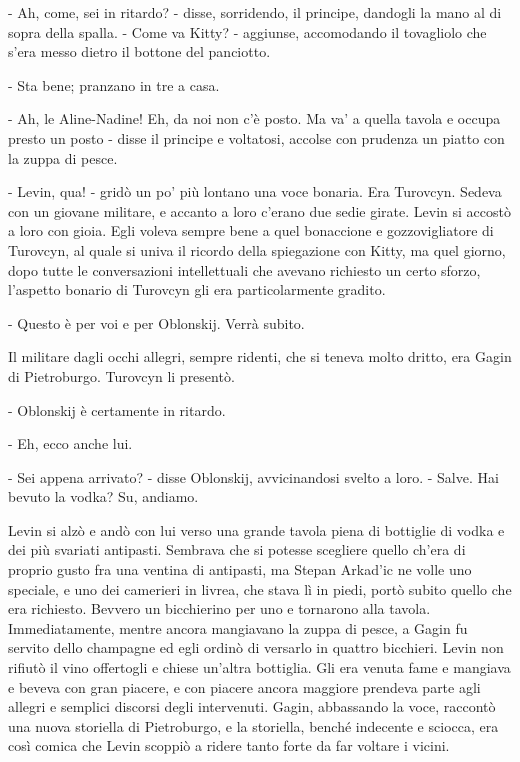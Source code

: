 - Ah, come, sei in ritardo? - disse, sorridendo, il principe, dandogli la mano al di sopra della spalla. - Come va Kitty? - aggiunse, accomodando il tovagliolo che s'era messo dietro il bottone del panciotto. 

- Sta bene; pranzano in tre a casa. 

- Ah, le Aline-Nadine! Eh, da noi non c'è posto. Ma va' a quella tavola e occupa presto un posto - disse il principe e voltatosi, accolse con prudenza un piatto con la zuppa di pesce. 

- Levin, qua! - gridò un po' più lontano una voce bonaria. Era Turovcyn. Sedeva con un giovane militare, e accanto a loro c'erano due sedie girate. Levin si accostò a loro con gioia. Egli voleva sempre bene a quel bonaccione e gozzovigliatore di Turovcyn, al quale si univa il ricordo della spiegazione con Kitty, ma quel giorno, dopo tutte le conversazioni intellettuali che avevano richiesto un certo sforzo, l'aspetto bonario di Turovcyn gli era particolarmente gradito. 

- Questo è per voi e per Oblonskij. Verrà subito. 

Il militare dagli occhi allegri, sempre ridenti, che si teneva molto dritto, era Gagin di Pietroburgo. Turovcyn li presentò. 

- Oblonskij è certamente in ritardo. 

- Eh, ecco anche lui. 

- Sei appena arrivato? - disse Oblonskij, avvicinandosi svelto a loro. - Salve. Hai bevuto la vodka? Su, andiamo. 

Levin si alzò e andò con lui verso una grande tavola piena di bottiglie di vodka e dei più svariati antipasti. Sembrava che si potesse scegliere quello ch'era di proprio gusto fra una ventina di antipasti, ma Stepan Arkad'ic ne volle uno speciale, e uno dei camerieri in livrea, che stava lì in piedi, portò subito quello che era richiesto. Bevvero un bicchierino per uno e tornarono alla tavola. Immediatamente, mentre ancora mangiavano la zuppa di pesce, a Gagin fu servito dello champagne ed egli ordinò di versarlo in quattro bicchieri. Levin non rifiutò il vino offertogli e chiese un'altra bottiglia. Gli era venuta fame e mangiava e beveva con gran piacere, e con piacere ancora maggiore prendeva parte agli allegri e semplici discorsi degli intervenuti. Gagin, abbassando la voce, raccontò una nuova storiella di Pietroburgo, e la storiella, benché indecente e sciocca, era così comica che Levin scoppiò a ridere tanto forte da far voltare i vicini. 

